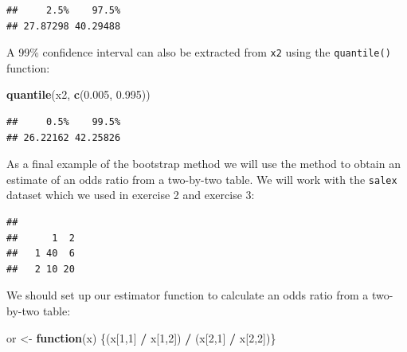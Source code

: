 \documentclass[12pt,a4paper]{book}
\newenvironment{Shaded}{\begin{snugshade}}{\end{snugshade}}
\newcommand{\ControlFlowTok}[1]{\textcolor[rgb]{0.13,0.29,0.53}{\textbf{#1}}}
\newcommand{\DataTypeTok}[1]{\textcolor[rgb]{0.13,0.29,0.53}{#1}}
\newcommand{\DecValTok}[1]{\textcolor[rgb]{0.00,0.00,0.81}{#1}}
\newcommand{\FloatTok}[1]{\textcolor[rgb]{0.00,0.00,0.81}{#1}}
\newcommand{\KeywordTok}[1]{\textcolor[rgb]{0.13,0.29,0.53}{\textbf{#1}}}
\newcommand{\NormalTok}[1]{#1}
\newcommand{\OperatorTok}[1]{\textcolor[rgb]{0.81,0.36,0.00}{\textbf{#1}}}
\newcommand{\OtherTok}[1]{\textcolor[rgb]{0.56,0.35,0.01}{#1}}
\newcommand{\StringTok}[1]{\textcolor[rgb]{0.31,0.60,0.02}{#1}}
\theoremstyle{definition}
\theoremstyle{definition}
\theoremstyle{definition}
\theoremstyle{remark}
\begin{document}
\begin{verbatim}
##     2.5%    97.5% 
## 27.87298 40.29488
\end{verbatim}

A 99\% confidence interval can also be extracted from \texttt{x2} using
the \texttt{quantile()} function:

\begin{Shaded}
\begin{Highlighting}[]
\KeywordTok{quantile}\NormalTok{(x2, }\KeywordTok{c}\NormalTok{(}\FloatTok{0.005}\NormalTok{, }\FloatTok{0.995}\NormalTok{))}
\end{Highlighting}
\end{Shaded}

\begin{verbatim}
##     0.5%    99.5% 
## 26.22162 42.25826
\end{verbatim}

As a final example of the bootstrap method we will use the method to
obtain an estimate of an odds ratio from a two-by-two table. We will
work with the \texttt{salex} dataset which we used in exercise 2 and
exercise 3:

\begin{Shaded}
\end{Shaded}

\begin{verbatim}
##    
##      1  2
##   1 40  6
##   2 10 20
\end{verbatim}

We should set up our estimator function to calculate an odds ratio from
a two-by-two table:

\begin{Shaded}
\begin{Highlighting}[]
\NormalTok{or <-}\StringTok{ }\ControlFlowTok{function}\NormalTok{(x) \{(x[}\DecValTok{1}\NormalTok{,}\DecValTok{1}\NormalTok{] }\OperatorTok{/}\StringTok{ }\NormalTok{x[}\DecValTok{1}\NormalTok{,}\DecValTok{2}\NormalTok{]) }\OperatorTok{/}\StringTok{ }\NormalTok{(x[}\DecValTok{2}\NormalTok{,}\DecValTok{1}\NormalTok{] }\OperatorTok{/}\StringTok{ }\NormalTok{x[}\DecValTok{2}\NormalTok{,}\DecValTok{2}\NormalTok{])\}}
\end{Highlighting}
\end{Shaded}
\end{document}
